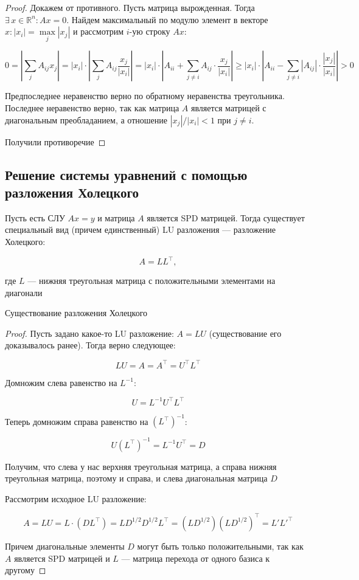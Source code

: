 \begin{proof}
    Докажем от противного. Пусть матрица вырожденная. Тогда $\exists \, x \in \mathbb{R}^n: Ax = 0$. Найдем максимальный по модулю элемент в векторе $x: |x_i| = \max\limits_{j} |x_j|$ и рассмотрим $i$-ую строку $Ax$:

    \[
    0 = \left|\sum\limits_{j} A_{ij}x_j\right| = |x_i| \cdot \left|\sum\limits_{j} A_{ij} \frac{x_j}{|x_i|}\right| =
    |x_i| \cdot \left|A_{ii} + \sum\limits_{j \neq i} A_{ij} \cdot \frac{x_j}{|x_i|}\right| \geqslant |x_i| \cdot \left|A_{ii} - \sum\limits_{j \neq i} |A_{ij}| \cdot \frac{|x_j|}{|x_i|}\right| > 0
    \]

    Предпоследнее неравенство верно по обратному неравенства треугольника. Последнее неравенство верно, так как матрица $A$ является матрицей с диагональным преобладанием, а отношение $|x_j| / |x_i| < 1$ при $j \neq i$.

    Получили противоречие
\end{proof}


\subsection{Решение системы уравнений с помощью разложения Холецкого}

Пусть есть СЛУ $Ax = y$ и матрица $A$ является SPD матрицей. Тогда существует специальный вид (причем единственный) LU разложения --- разложение Холецкого:

\[A = LL^{\top},\]

где $L$ --- нижняя треугольная матрица с положительными элементами на диагонали

\begin{claim}
    Существование разложения Холецкого
\end{claim}

\begin{proof}
    Пусть задано какое-то LU разложение: $A = LU$ (существование его доказывалось ранее). Тогда верно следующее:

    \[
    LU = A = A^{\top} = U^{\top} L^{\top}
    \]

    Домножим слева равенство на $L^{-1}$:

    \[
    U = L^{-1} U^{\top} L^{\top}
    \]

    Теперь домножим справа равенство на $(L^{\top})^{-1}$:

    \[
    U (L^{\top})^{-1} = L^{-1} U^{\top} = D
    \]

    Получим, что слева у нас верхняя треугольная матрица, а справа нижняя треугольная матрица, поэтому и справа, и слева диагональная матрица $D$

    Рассмотрим исходное LU разложение:

    \[
    A = LU = L \cdot (D L^{\top}) = L D^{1/2} D^{1/2} L^{\top} = (L D^{1/2}) (L D^{1/2})^{\top} = L' L'^{\top}
    \]

    Причем диагональные элементы $D$ могут быть только положительными, так как $A$ является SPD матрицей и $L$ --- матрица перехода от одного базиса к другому

\end{proof}

